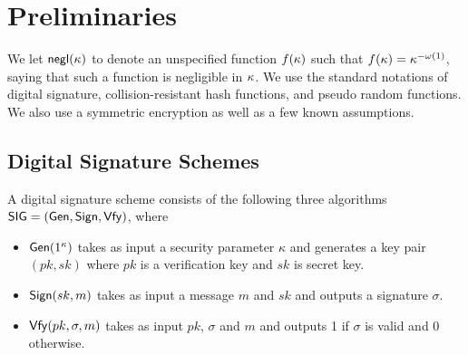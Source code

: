 \section{Preliminaries}\label{sec:pre}
We let ${\mathsf{negl}}(\kappa)$ to denote an unspecified
function $f(\kappa)$ such that
$f(\kappa) ={\kappa}^{-\omega(1)}$, saying that such a
function is negligible in $\kappa$.
We use the standard notations of digital signature,
collision-resistant hash functions, and pseudo random
functions.
We also use a symmetric encryption as well as a few
known assumptions.

\subsection{Digital Signature Schemes} \label{sec:signature}
A digital signature scheme consists of the following
three algorithms $\mathsf{SIG} = (\mathsf{Gen},\mathsf{Sign},\mathsf{Vfy})$, where
\begin{itemize}
 \item{$\mathsf{Gen}(1^{\kappa})$ takes as input a security
 parameter $\kappa$ and generates a key pair $(pk, sk)$
 where $pk$ is a verification key and $sk$ is secret
 key.}
 \item{$\mathsf{Sign}(sk, m)$ takes as input a message $m$ and
 $sk$ and outputs a signature $\sigma$.}
 \item{$\mathsf{Vfy}(pk,\sigma,m)$ takes as input $pk$, $\sigma$
 and $m$ and outputs 1 if $\sigma$ is valid and 0
 otherwise.}
\end{itemize}
